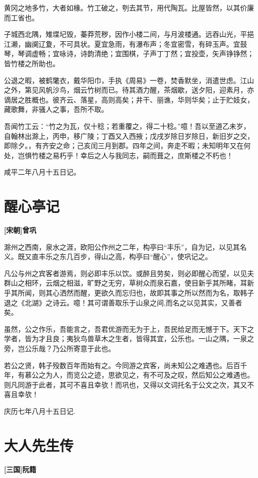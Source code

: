 \documentclass[UTF8,titlepage,oneside]{ctexbook}
\begin{document}
黄冈之地多竹，大者如椽。竹工破之，刳去其节，用代陶瓦。比屋皆然，以其价廉而工省也。

子城西北隅，雉堞圮毁，蓁莽荒秽，因作小楼二间，与月波楼通。远吞山光，平挹江濑，幽阒辽夐，不可具状。夏宜急雨，有瀑布声；冬宜密雪，有碎玉声。宜鼓琴，琴调虚畅；宜咏诗，诗韵清绝；宜围棋，子声丁丁然；宜投壶，矢声铮铮然；皆竹楼之所助也。

公退之暇，被鹤氅衣，戴华阳巾，手执《周易》一卷，焚香默坐，消遣世虑。江山之外，第见风帆沙鸟，烟云竹树而已。待其酒力醒，茶烟歇，送夕阳，迎素月，亦谪居之胜概也。彼齐云、落星，高则高矣；井干、丽谯，华则华矣；止于贮妓女，藏歌舞，非骚人之事，吾所不取。

吾闻竹工云：“竹之为瓦，仅十稔；若重覆之，得二十稔。”噫！吾以至道乙未岁，自翰林出滁上，丙申，移广陵；丁酉又入西掖；戊戌岁除日岁除日，新旧岁之交，即除夕。，有齐安之命；己亥闰三月到郡。四年之间，奔走不暇；未知明年又在何处，岂惧竹楼之易朽乎！幸后之人与我同志，嗣而葺之，庶斯楼之不朽也！

咸平二年八月十五日记。


\chapter*{醒心亭记}
\begin{center}
	\textbf{[宋朝]曾巩}
\end{center}

滁州之西南，泉水之涯，欧阳公作州之二年，构亭曰“丰乐”，自为记，以见其名义。既又直丰乐之东几百步，得山之高，构亭曰“醒心”，使巩记之。


凡公与州之宾客者游焉，则必即丰乐以饮。或醉且劳矣，则必即醒心而望，以见夫群山之相环，云烟之相滋，旷野之无穷，草树众而泉石嘉，使目新乎其所睹，耳新乎其所闻，则其心洒然而醒，更欲久而忘归也，故即其事之所以然而为名，取韩子退之《北湖》之诗云。噫！其可谓善取乐于山泉之间,而名之以见其实，又善者矣。


虽然，公之作乐，吾能言之，吾君优游而无为于上，吾民给足而无憾于下。天下之学者，皆为才且良；夷狄鸟兽草木之生者，皆得其宜，公乐也。一山之隅，一泉之旁，岂公乐哉？乃公所寄意于此也。


若公之贤，韩子殁数百年而始有之。今同游之宾客，尚未知公之难遇也。后百千年，有慕公之为人，而览公之迹，思欲见之，有不可及之叹，然后知公之难遇也。则凡同游于此者，其可不喜且幸欤！而巩也，又得以文词托名于公文之次，其又不喜且幸欤！


庆历七年八月十五日记.



\chapter*{大人先生传}
\begin{center}
	\textbf{[三国]阮籍}
\end{center}
\end{document}
